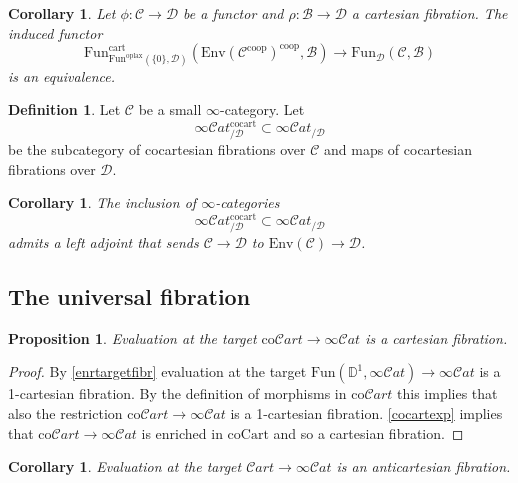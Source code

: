 \documentclass[10pt,oneside]{article}
\numberwithin{equation}{section} %
\numberwithin{figure}{section} %
\theoremstyle{plain}
\newtheorem{proposition}[theorem]{Proposition}
\newtheorem{corollary}[theorem]{Corollary}
\theoremstyle{definition}
\newtheorem{definition}[theorem]{Definition}
\newcommand{\bD}{{\mathbb D}}
\newcommand{\mB}{{\mathcal B}}
\newcommand{\mC}{{\mathcal C}}
\newcommand{\mD}{{\mathcal D}}
\newcommand{\Env}{{\mathrm{Env}}}
\newcommand{\co}{\mathrm{co}}
\newcommand{\Fun}{\mathrm{Fun}}
\newcommand{\cocart}{{\mathrm{cocart}}}
\newcommand{\cart}{{\mathrm{cart}}}
\newcommand{\Cart}{{\mathrm{Cart}}}
\newcommand{\oplax}{{\mathrm{oplax}}}
\newcommand{\coop}{\mathrm{coop}}
\newcommand{\scat}{\mathcal{C}\mathit{at}}
\begin{document}
\begin{corollary}\label{envelo2}
Let $\phi: \mC \to \mD $ be a functor and
$\rho: \mB \to \mD $ a cartesian fibration.
The induced functor
$$ \Fun^\cart_{\Fun^\oplax(\{0\},\mD)}(\Env(\mC^\coop)^\coop,\mB) \to \Fun_\mD(\mC,\mB) $$
is an equivalence.
\end{corollary}

\begin{definition}Let $\mC$ be a small $\infty$-category.
Let $$ \infty\scat^\cocart_{/\mD}\subset \infty\scat_{/\mD} $$
be the subcategory of cocartesian fibrations over $\mC$ and maps of cocartesian fibrations over $\mD$.
\end{definition}

\begin{corollary}\label{huip}
The inclusion of $\infty$-categories $$\infty\scat^\cocart_{/\mD}\subset \infty\scat_{/\mD}$$
admits a left adjoint that sends $\mC \to \mD$ 
to $\Env(\mC) \to \mD$.
\end{corollary}

\subsection{The universal fibration}



\begin{proposition}

Evaluation at the target $\co\mathcal{C}\mathit{art} \to \infty\scat$
is a cartesian fibration.
  
\end{proposition}

\begin{proof}

By \cref{enrtargetfibr} evaluation at the target $\Fun(\bD^1,\infty\scat) \to \infty\scat$
is a 1-cartesian fibration.
By the definition of morphisms in $\co\mathcal{C}\mathit{art}$ this implies that
also the restriction $\co\mathcal{C}\mathit{art} \to \infty\scat$ is a 1-cartesian fibration.
\cref{cocartexp} implies that $\co\mathcal{C}\mathit{art} \to \infty\scat$ is enriched in $\co\Cart$
and so a cartesian fibration. 
\end{proof}

\begin{corollary}

Evaluation at the target $\mathcal{C}\mathit{art} \to \infty\scat$
is an anticartesian fibration.
  
\end{corollary}
\end{document}
